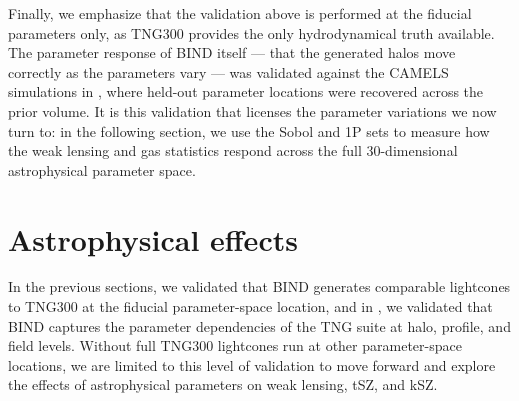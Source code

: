 \documentclass[linenumbers,trackchanges, twocolumn]{aastex701}
\begin{document}
Finally, we emphasize that the validation above is performed at the fiducial parameters only, as TNG300 provides the only hydrodynamical truth available. The parameter response of BIND itself --- that the generated halos move correctly as the parameters vary --- was validated against the CAMELS simulations in \citet{Lee-2026b}, where held-out parameter locations were recovered across the prior volume. It is this validation that licenses the parameter variations we now turn to: in the following section, we use the Sobol and 1P sets to measure how the weak lensing and gas statistics respond across the full 30-dimensional astrophysical parameter space.
 
\section{Astrophysical effects}\label{sec:astro}
In the previous sections, we validated that \textsc{BIND} generates comparable lightcones to TNG300 at the fiducial parameter-space location, and in \citep{Lee-2026b}, we validated that \textsc{BIND} captures the parameter dependencies of the TNG suite at halo, profile, and field levels. Without full TNG300 lightcones run at other parameter-space locations, we are limited to this level of validation to move forward and explore the effects of astrophysical parameters on weak lensing, tSZ, and kSZ.
\end{document}
